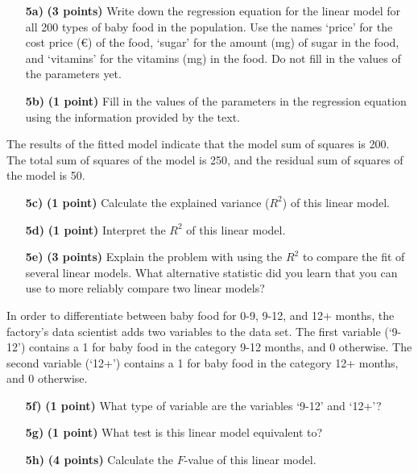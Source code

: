 \begin{itemize}

    \item[\textbf{5a)}] \textbf{(3 points)} Write down the regression equation for the linear model for all 200 types of baby food in the population. Use the names ‘price’ for the cost price (\euro) of the food, ‘sugar’ for the amount (mg) of sugar in the food, and ‘vitamins’ for the vitamins (mg) in the food. Do not fill in the values of the parameters yet. 
    
    \item[\textbf{5b)}] \textbf{(1 point)} Fill in the values of the parameters in the regression equation using the information provided by the text.

\end{itemize}

The results of the fitted model indicate that the model sum of squares is 200. The total sum of squares of the model is 250, and the residual sum of squares of the model is 50.

\begin{itemize}

    \item[\textbf{5c)}] \textbf{(1 point)} Calculate the explained variance ($R^2$) of this linear model.
    
    \item[\textbf{5d)}] \textbf{(1 point)} Interpret the $R^2$ of this linear model.
    
    \item[\textbf{5e)}] \textbf{(3 points)} Explain the problem with using the $R^2$ to compare the fit of several linear models. What alternative statistic did you learn that you can use to more reliably compare two linear models? 
    
\end{itemize}

\clearpage %

In order to differentiate between baby food for 0-9, 9-12, and 12+ months, the factory’s data scientist adds two variables to the data set. The first variable (‘9-12’) contains a 1 for baby food in the category 9-12 months, and 0 otherwise. The second variable (‘12+’) contains a 1 for baby food in the category 12+ months, and 0 otherwise.

\begin{itemize}
    
    \item[\textbf{5f)}] \textbf{(1 point)} What type of variable are the variables ‘9-12’ and ‘12+’? 
    
    \item[\textbf{5g)}] \textbf{(1 point)} What test is this linear model equivalent to?
    
    \item[\textbf{5h)}] \textbf{(4 points)} Calculate the $F$-value of this linear model.
    
\end{itemize}

